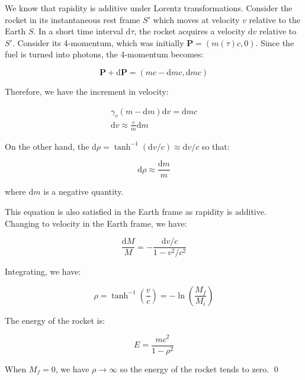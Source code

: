 \documentclass[12pt]{article}
\begin{document}
We know that rapidity is additive under Lorentz transformations. Consider the rocket in its instantaneous rest frame $S'$ which moves at velocity $v$ relative to the Earth $S$. In a short time interval $\mathrm{d}\tau$, the rocket acquires a velocity $\mathrm{d}v$ relative to $S'$. Consider its 4-momentum, which was initially $\mathbf{P} = (m(\tau)c, 0)$. Since the fuel is turned into photons, the 4-momentum becomes:

\begin{equation}
    \mathbf{P} + \mathrm{d}\mathbf{P} = (m c - \mathrm{d}m c, \mathrm{d}m c)
\end{equation}

Therefore, we have the increment in velocity:

\begin{equation}
    \begin{split}
        \gamma_{v} (m - \mathrm{d}m) \mathrm{d}v = \mathrm{d}m c \\
        \mathrm{d}v \approx \frac{c}{m} \mathrm{d}m
    \end{split}
\end{equation}

On the other hand, the $\mathrm{d}\rho = \tanh^{-1}(\mathrm{d}v/c) \approx \mathrm{d}v/c$ so that:

\begin{equation}
    \mathrm{d}\rho \approx \frac{\mathrm{d}m}{m}
\end{equation}

where $\mathrm{d}m$ is a negative quantity.

This equation is also satisfied in the Earth frame as rapidity is additive. Changing to velocity in the Earth frame, we have:

\begin{equation}
    \frac{\mathrm{d}M}{M} = -\frac{\mathrm{d}v/c}{1 - v^{2}/c^{2}}
\end{equation}

Integrating, we have:

\begin{equation}
    \rho = \tanh^{-1} \left( \frac{v}{c} \right) = -\ln{\left( \frac{M_{f}}{M_{i}} \right)}
\end{equation}

The energy of the rocket is:

\begin{equation}
    E = \frac{mc^{2}}{1 - \rho^{2}}
\end{equation}

When $M_{f} = 0$, we have $\rho \to \infty$ so the energy of the rocket tends to zero.
\qed
\end{document}
